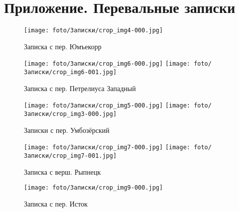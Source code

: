 \newpage
\section{Приложение. Перевальные записки}
\begin{figure}[H]
    \centering
    \texttt{[image: foto/Записки/crop\_img4-000.jpg]}
    \caption{Записка с пер. Юмъекорр}
\end{figure}

\begin{figure}
    \centering
    \texttt{[image: foto/Записки/crop\_img6-000.jpg]}
    \texttt{[image: foto/Записки/crop\_img6-001.jpg]}
    \caption{Записка с пер. Петрелиуса Западный}
\end{figure}

\begin{figure}
    \centering
    \texttt{[image: foto/Записки/crop\_img5-000.jpg]}
    \texttt{[image: foto/Записки/crop\_img3-000.jpg]}
    \caption{Записки с пер. Умбозёрский}
\end{figure}

\begin{figure}
    \centering
    \texttt{[image: foto/Записки/crop\_img7-000.jpg]}
    \break
    \break
    \texttt{[image: foto/Записки/crop\_img7-001.jpg]}
    \caption{Записка с верш. Рыпнецк}
\end{figure}

\begin{figure}
    \centering
    \texttt{[image: foto/Записки/crop\_img9-000.jpg]}
    \caption{Записка с пер. Исток}
\end{figure}
